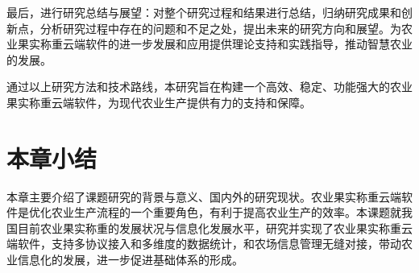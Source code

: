 最后，进行研究总结与展望：对整个研究过程和结果进行总结，归纳研究成果和创新点，分析研究过程中存在的问题和不足之处，提出未来的研究方向和展望。为农业果实称重云端软件的进一步发展和应用提供理论支持和实践指导，推动智慧农业的发展。

通过以上研究方法和技术路线，本研究旨在构建一个高效、稳定、功能强大的农业果实称重云端软件，为现代农业生产提供有力的支持和保障。

\section{本章小结}

本章主要介绍了课题研究的背景与意义、国内外的研究现状。农业果实称重云端软件是优化农业生产流程的一个重要角色，有利于提高农业生产的效率。本课题就我国目前农业果实称重的发展状况与信息化发展水平，研究并实现了农业果实称重云端软件，支持多协议接入和多维度的数据统计，和农场信息管理无缝对接，带动农业信息化的发展，进一步促进基础体系的形成。

